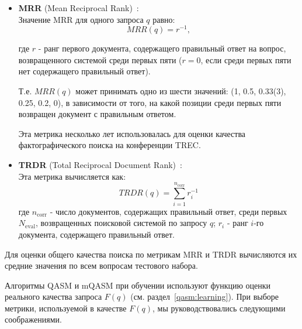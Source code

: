 \documentclass{article}
\begin{document}
\begin{itemize}
\item {\bf MRR} (Mean Reciprocal Rank)~\cite{qa:TREC8:evaluation}: \\
Значение MRR для одного запроса $q$ равно:
$$MRR(q) = r^{-1},$$

где $r$ - ранг первого документа, содержащего правильный ответ на вопрос,
возвращенного системой среди первых пяти
($r=0$, если среди первых пяти нет содержащего правильный ответ).

Т.е. $MRR(q)$ может принимать одно из шести значений:
(1, 0.5, 0.33(3), 0.25, 0.2, 0), в зависимости от того, на какой позиции среди первых пяти
возвращен документ с правильным ответом.


Эта метрика несколько лет использовалась для
оценки качества фактографического поиска на конференции TREC.

\item {\bf TRDR} (Total Reciprocal Document Rank)~\cite{qa:radev:qasm}: \\
Эта метрика вычисляется как:
$$TRDR(q) = \sum_{i=1}^{n_{\text{corr}}} r_i^{-1}$$
где $n_{\text{corr}}$ - число документов, содержащих правильный ответ, среди первых
$N_\text{eval}$,
возвращенных поисковой системой по запросу $q$;
$r_i$ - ранг $i$-го документа, содержащего правильный ответ.

\end{itemize}

Для оценки общего качества поиска по метрикам MRR и TRDR вычисляются
их средние значения по всем вопросам тестового набора.

Алгоритмы QASM и mQASM при обучении используют
функцию оценки реального качества запроса $F(q)$ (см. раздел~\ref{qasm:learning}).
При выборе метрики, используемой в качестве $F(q)$, мы руководствовались
следующими соображениями.
\end{document}
